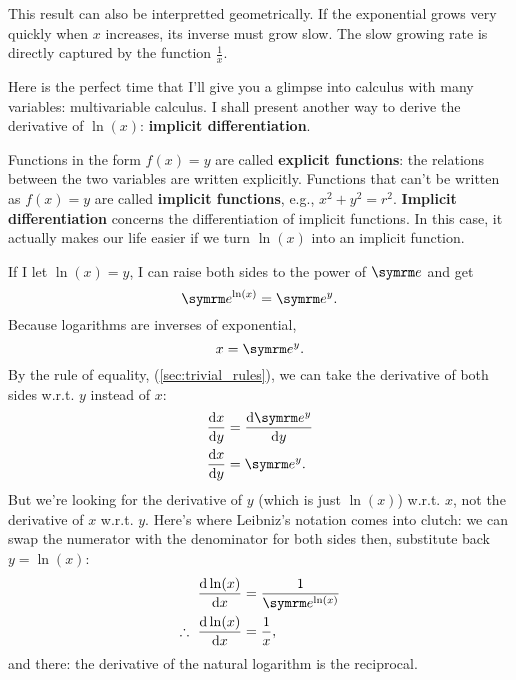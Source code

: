 This result can also be interpretted geometrically. If the exponential grows very quickly when $x$ increases, its inverse must grow slow. The slow growing rate is directly captured by the function $\frac{1}{x}$.

Here is the perfect time that I'll give you a glimpse into calculus with many variables: multivariable calculus. I shall present another way to derive the derivative of $\ln(x)$: \textbf{implicit differentiation}.

Functions in the form $f(x) = y$ are called \textbf{explicit functions}: the relations between the two variables are written explicitly. Functions that can't be written as $f(x) = y$ are called \textbf{implicit functions}, e.g., $x^2 + y^2 = r^2$. \textbf{Implicit differentiation} concerns the differentiation of implicit functions. In this case, it actually makes our life easier if we turn $\ln(x)$ into an implicit function.

If I let $\ln(x) = y$, I can raise both sides to the power of $\e$ and get
\begin{equation}
    \e^{\ln(x)} = \e^y.
\end{equation}
Because logarithms are inverses of exponential,
\begin{equation}
    x = \e^y.
\end{equation}
By the rule of equality, (\cref{sec:trivial_rules}), we can take the derivative of both sides w.r.t. $y$ instead of $x$:
\begin{align*}
    \odv{x}{y} &= \odv{\e^y}{y} \\
    \odv{x}{y} &= \e^y.
\end{align*}
But we're looking for the derivative of $y$ (which is just $\ln(x)$) w.r.t. $x$, not the derivative of $x$ w.r.t. $y$. Here's where Leibniz's notation comes into clutch: we can swap the numerator with the denominator for both sides then, substitute back $y = \ln(x)$:
\begin{align*}
    \odv{\ln(x)}{x} &= \frac{1}{\e^{\ln(x)}} \\
    \therefore~\odv{\ln(x)}{x} &= \frac{1}{x},
\end{align*}
and there: the derivative of the natural logarithm is the reciprocal.

